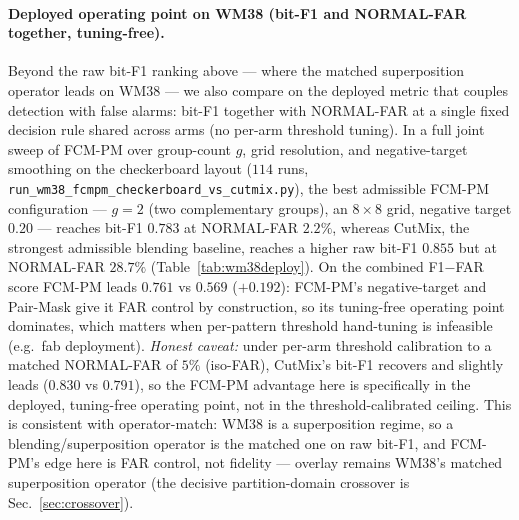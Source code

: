 \documentclass[11pt]{article}
\begin{document}
\paragraph{Deployed operating point on WM38 (bit-F1 and NORMAL-FAR together, tuning-free).}
Beyond the raw bit-F1 ranking above --- where the matched superposition operator leads on
WM38 --- we also compare on the deployed metric that couples detection with false alarms:
bit-F1 together with NORMAL-FAR at a single fixed decision rule shared across arms (no
per-arm threshold tuning). In a full joint sweep of FCM-PM over group-count $g$, grid
resolution, and negative-target smoothing on the checkerboard layout ($114$ runs,
\texttt{run\_wm38\_fcmpm\_checkerboard\_vs\_cutmix.py}), the best admissible FCM-PM
configuration --- $g{=}2$ (two complementary groups), an $8{\times}8$ grid, negative
target $0.20$ --- reaches bit-F1 $0.783$ at NORMAL-FAR $2.2\%$, whereas CutMix, the
strongest admissible blending baseline, reaches a higher raw bit-F1 $0.855$ but at
NORMAL-FAR $28.7\%$ (Table~\ref{tab:wm38deploy}). On the combined F1$-$FAR score FCM-PM
leads $0.761$ vs $0.569$ ($+0.192$): FCM-PM's negative-target and Pair-Mask give it FAR
control by construction, so its tuning-free operating point dominates, which matters when
per-pattern threshold hand-tuning is infeasible (e.g.\ fab deployment). \emph{Honest
caveat:} under per-arm threshold calibration to a matched NORMAL-FAR of $5\%$ (iso-FAR),
CutMix's bit-F1 recovers and slightly leads ($0.830$ vs $0.791$), so the FCM-PM advantage
here is specifically in the deployed, tuning-free operating point, not in the
threshold-calibrated ceiling. This is consistent with operator-match: WM38 is a
superposition regime, so a blending/superposition operator is the matched one on raw
bit-F1, and FCM-PM's edge here is FAR control, not fidelity --- overlay remains WM38's
matched superposition operator (the decisive partition-domain crossover is
Sec.~\ref{sec:crossover}).
\end{document}
